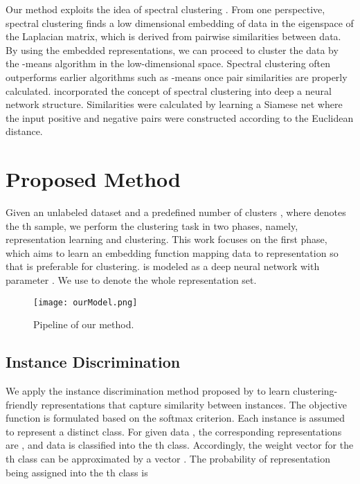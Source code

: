 \documentclass{article} \usepackage{iclr2021_conference,times}
\begin{document}
Our method exploits the idea of spectral clustering \cite{shi2000normalized, meila2001learning, von2007tutorial, ng2002spectral}. From one perspective, spectral clustering finds a low dimensional embedding of data in the eigenspace of the Laplacian matrix, which is derived from pairwise similarities between data. By using the embedded representations, we can proceed to cluster the data by the -means algorithm in the low-dimensional space. Spectral clustering often outperforms earlier algorithms such as -means once pair similarities are properly calculated.
\cite{shaham2018spectralnet} incorporated the concept of spectral clustering into deep a neural network structure. Similarities were calculated by learning a Siamese net \cite{shaham2018learning} where the input positive and negative pairs were constructed according to the Euclidean distance.


\section{Proposed Method}
\label{sec:method}
Given an unlabeled dataset  and a predefined number of clusters , where  denotes the th sample, we perform the clustering task in two phases, namely, representation learning and clustering. This work focuses on the first phase, which aims to learn an embedding function  mapping data  to representation  so that  is preferable for clustering.  is modeled as a deep neural network with parameter . We use  to denote the whole representation set.

\begin{figure}[h]
  \centering
  \texttt{[image: ourModel.png]}
  \caption{Pipeline of our method.}
\label{Fig:ourModel}
\end{figure}

\subsection{Instance Discrimination}

We apply the instance discrimination method proposed by \cite{wu2018unsupervised} to learn clustering-friendly representations that capture similarity between instances.
The objective function is formulated based on the softmax criterion. Each instance is assumed to represent a distinct class. For given data , the corresponding representations are , and data  is classified into the th class.
Accordingly, the weight vector for the th class can be approximated by a vector . The probability of representation  being assigned into the th class is
\end{document}

